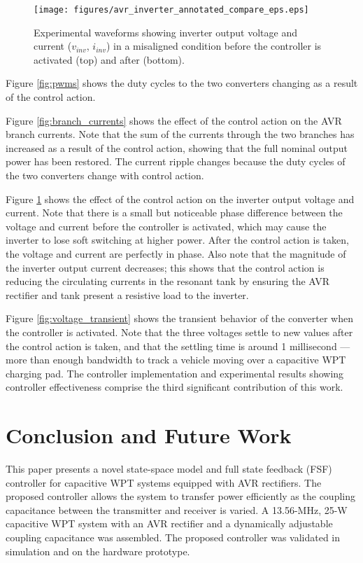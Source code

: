 \documentclass[conference, twocolumn, letterpaper]{IEEEtran}
\begin{document}
\begin{figure}[!ht]
	\centering
	\texttt{[image: figures/avr\_inverter\_annotated\_compare\_eps.eps]}
	\caption{Experimental waveforms showing inverter output voltage and current ($v_{inv}$, $i_{inv}$) in a misaligned condition before the controller is activated (top) and after (bottom).}
	\label{fig:inverter}
\end{figure}

Figure \ref{fig:pwms} shows the duty cycles to the two converters changing as a result of the control action.

Figure \ref{fig:branch_currents} shows the effect of the control action on the AVR branch currents. Note that the sum of the currents through the two branches has increased as a result of the control action, showing that the full nominal output power has been restored. The current ripple changes because the duty cycles of the two converters change with control action. 

Figure \ref{fig:inverter} shows the effect of the control action on the inverter output voltage and current. Note that there is a small but noticeable phase difference between the voltage and current before the controller is activated, which may cause the inverter to lose soft switching at higher power. After the control action is taken, the voltage and current are perfectly in phase. Also note that the magnitude of the inverter output current decreases; this shows that the control action is reducing the circulating currents in the resonant tank by ensuring the AVR rectifier and tank present a resistive load to the inverter. 

Figure \ref{fig:voltage_transient} shows the transient behavior of the converter when the controller is activated. Note that the three voltages settle to new values after the control action is taken, and that the settling time is around 1 millisecond --- more than enough bandwidth to track a vehicle moving over a capacitive WPT charging pad. The controller implementation and experimental results showing controller effectiveness comprise the third significant contribution of this work.

\section{Conclusion and Future Work}
\label{sec:conclusion}

This paper presents a novel state-space model and full state feedback (FSF) controller for capacitive WPT systems equipped with AVR rectifiers. The proposed controller allows the system to transfer power efficiently as the coupling capacitance between the transmitter and receiver is varied. A 13.56-MHz, 25-W capacitive WPT system with an AVR rectifier and a dynamically adjustable coupling capacitance was assembled. The proposed controller was validated in simulation and on the hardware prototype.
\end{document}
